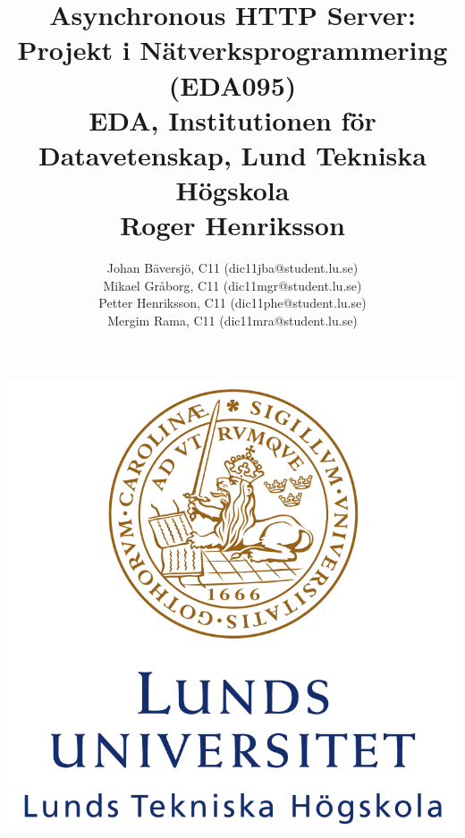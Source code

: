 \documentclass[a4paper]{article}%
\title{
	Asynchronous HTTP Server:\\
	Projekt i Nätverksprogrammering (EDA095)\\
	EDA, Institutionen för Datavetenskap, Lund Tekniska Högskola\\
	Roger Henriksson}
\author{
Johan Bäversjö, C11 (dic11jba@student.lu.se)\\
Mikael Gråborg, C11 (dic11mgr@student.lu.se)\\
Petter Henriksson, C11 (dic11phe@student.lu.se)\\
Mergim Rama, C11 (dic11mra@student.lu.se)\\
}
\begin{document}

\maketitle
\centerline{\includegraphics[scale = 0.6]{LTH.jpg}}
\thispagestyle{empty}

\newpage
\setcounter{page}{1}


\tableofcontents
\newpage










\end{document}
